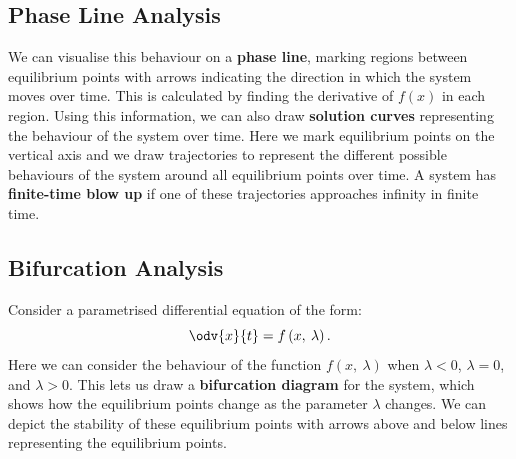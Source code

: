 \documentclass{article}
\begin{document}
\subsection{Phase Line Analysis}
We can visualise this behaviour on a \textbf{phase line}, marking
regions between equilibrium points with arrows indicating the direction
in which the system moves over time. This is calculated by finding the
derivative of \(f\left( x \right)\) in each region. Using this
information, we can also draw \textbf{solution curves} representing the
behaviour of the system over time. Here we mark equilibrium points on
the vertical axis and we draw trajectories to represent the different
possible behaviours of the system around all equilibrium points over
time. A system has \textbf{finite-time blow up} if one of these
trajectories approaches infinity in finite time.
\subsection{Bifurcation Analysis}
Consider a parametrised differential equation of the form:
\begin{equation*}
    \odv{x}{t} = f\left( x,\: \lambda \right).
\end{equation*}
Here we can consider the behaviour of the function \(f\left( x,\: \lambda \right)\)
when \(\lambda < 0\), \(\lambda = 0\), and \(\lambda > 0\). This lets us
draw a \textbf{bifurcation diagram} for the system, which shows how the
equilibrium points change as the parameter \(\lambda\) changes. We can
depict the stability of these equilibrium points with arrows above and
below lines representing the equilibrium points.
\end{document}
